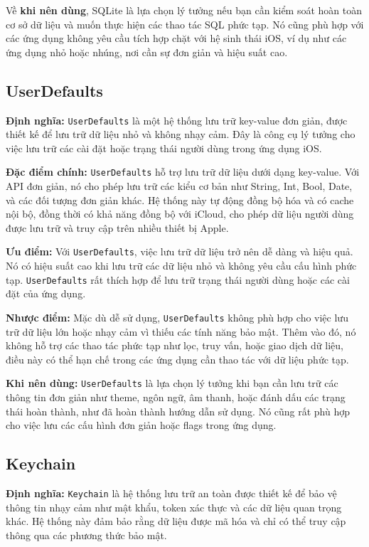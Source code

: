 Về \textbf{khi nên dùng}, SQLite là lựa chọn lý tưởng nếu bạn cần kiểm soát hoàn toàn cơ sở dữ liệu và muốn thực hiện các thao tác SQL phức tạp. Nó cũng phù hợp với các ứng dụng không yêu cầu tích hợp chặt với hệ sinh thái iOS, ví dụ như các ứng dụng nhỏ hoặc nhúng, nơi cần sự đơn giản và hiệu suất cao.

\subsection{UserDefaults}
\textbf{Định nghĩa:} \texttt{UserDefaults} là một hệ thống lưu trữ key-value đơn giản, được thiết kế để lưu trữ dữ liệu nhỏ và không nhạy cảm. Đây là công cụ lý tưởng cho việc lưu trữ các cài đặt hoặc trạng thái người dùng trong ứng dụng iOS.

\textbf{Đặc điểm chính:} \texttt{UserDefaults} hỗ trợ lưu trữ dữ liệu dưới dạng key-value. Với API đơn giản, nó cho phép lưu trữ các kiểu cơ bản như String, Int, Bool, Date, và các đối tượng đơn giản khác. Hệ thống này tự động đồng bộ hóa và có cache nội bộ, đồng thời có khả năng đồng bộ với iCloud, cho phép dữ liệu người dùng được lưu trữ và truy cập trên nhiều thiết bị Apple.

\textbf{Ưu điểm:} Với \texttt{UserDefaults}, việc lưu trữ dữ liệu trở nên dễ dàng và hiệu quả. Nó có hiệu suất cao khi lưu trữ các dữ liệu nhỏ và không yêu cầu cấu hình phức tạp. \texttt{UserDefaults} rất thích hợp để lưu trữ trạng thái người dùng hoặc các cài đặt của ứng dụng.

\textbf{Nhược điểm:} Mặc dù dễ sử dụng, \texttt{UserDefaults} không phù hợp cho việc lưu trữ dữ liệu lớn hoặc nhạy cảm vì thiếu các tính năng bảo mật. Thêm vào đó, nó không hỗ trợ các thao tác phức tạp như lọc, truy vấn, hoặc giao dịch dữ liệu, điều này có thể hạn chế trong các ứng dụng cần thao tác với dữ liệu phức tạp.

\textbf{Khi nên dùng:} \texttt{UserDefaults} là lựa chọn lý tưởng khi bạn cần lưu trữ các thông tin đơn giản như theme, ngôn ngữ, âm thanh, hoặc đánh dấu các trạng thái hoàn thành, như đã hoàn thành hướng dẫn sử dụng. Nó cũng rất phù hợp cho việc lưu các cấu hình đơn giản hoặc flags trong ứng dụng.

\subsection{Keychain}
\textbf{Định nghĩa:} \texttt{Keychain} là hệ thống lưu trữ an toàn được thiết kế để bảo vệ thông tin nhạy cảm như mật khẩu, token xác thực và các dữ liệu quan trọng khác. Hệ thống này đảm bảo rằng dữ liệu được mã hóa và chỉ có thể truy cập thông qua các phương thức bảo mật.

